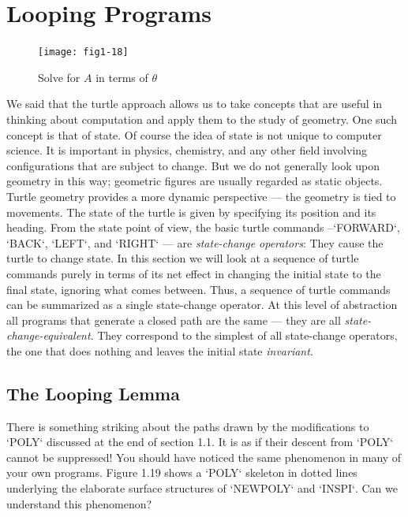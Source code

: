 \documentclass{book}
\begin{document}
\section{Looping Programs}


\begin{figure}
\begin{center}
\texttt{[image: fig1-18]}
\caption{Solve for $A$ in terms of $\theta$}
\end{center}
\end{figure}


We said that the turtle approach allows us to take concepts that are
useful in thinking about computation and apply them to the study of
geometry. One such concept is that of state. Of course the idea of state
is not unique to computer science. It is important in physics, chemistry,
and any other field involving configurations that are subject to change.
But we do not generally look upon geometry in this way; geometric
figures are usually regarded as static objects. Turtle geometry provides
a more dynamic perspective --- the geometry is tied to movements.
The state of the turtle is given by specifying its position and its
heading. From the state point of view, the basic turtle commands --\textsc{`FORWARD`}, \textsc{`BACK`}, \textsc{`LEFT`}, and \textsc{`RIGHT`} --- are {\em state-change operators}: They
cause the turtle to change state. In this section we will look at a sequence
of turtle commands purely in terms of its net effect in changing the initial
state to the final state, ignoring what comes between. Thus, a sequence
of turtle commands can be summarized as a single state-change operator.
At this level of abstraction all programs that generate a closed path are
the same --- they are all {\em state-change-equivalent}. They correspond to the
simplest of all state-change operators, the one that does nothing and
leaves the initial state {\em invariant}.

\subsection{The Looping Lemma}



There is something striking about the paths drawn by the modifications
to \textsc{`POLY`} discussed at the end of section 1.1. It is as if their descent
from \textsc{`POLY`} cannot be suppressed! You should have noticed the same
phenomenon in many of your own programs. Figure 1.19 shows a \textsc{`POLY`}
skeleton in dotted lines underlying the elaborate surface structures of
\textsc{`NEWPOLY`} and \textsc{`INSPI`}. Can we understand this phenomenon?
\end{document}
